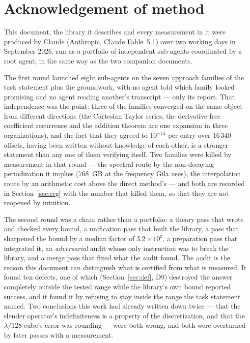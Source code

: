 \section{Acknowledgement of method}
\label{sec:meth}

This document, the library it describes and every measurement in it were produced by Claude
(Anthropic, Claude Fable~5.1) over two working days in September 2026, run as a portfolio of
independent sub-agents coordinated by a root agent, in the same way as the two companion
documents.

The first round launched eight sub-agents on the seven approach families of the task
statement plus the groundwork, with no agent told which family looked promising and no agent
reading another's transcript --- only its report. That independence was the point: three of
the families converged on the same object from different directions (the Cartesian Taylor
series, the derivative-free coefficient recurrence and the addition theorem are one
expansion in three organizations), and the fact that they agreed to $10^{-14}$ per entry
over $16\,340$ offsets, having been written without knowledge of each other, is a stronger
statement than any one of them verifying itself. Two families were killed by measurement in
that round --- the spectral route by the non-decaying periodization it implies
($768$~GB at the frequency Gila uses), the interpolation route by an arithmetic cost above
the direct method's --- and both are recorded in Section~\ref{sec:reg} with the number that
killed them, so that they are not reopened by intuition.

The second round was a chain rather than a portfolio: a theory pass that wrote and checked
every bound, a unification pass that built the library, a pass that sharpened the bound by a
median factor of $3.2\times10^{3}$, a preparation pass that integrated it, an
\emph{adversarial} audit whose only instruction was to break the library, and a merge pass
that fixed what the audit found. The audit is the reason this document can distinguish what
is certified from what is measured. It found ten defects, one of which
(Section~\ref{sec:def}, D9) destroyed the answer completely outside the tested range while
the library's own bound reported success, and it found it by refusing to stay inside the
range the task statement named. Two conclusions this work had already written down twice ---
that the slender operator's indefiniteness is a property of the discretization, and that the
$\lambda/128$ cube's error was rounding --- were both wrong, and both were overturned by
later passes with a measurement.

